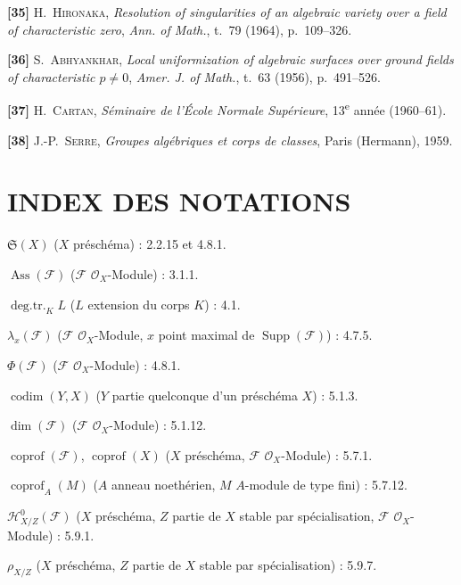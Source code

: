 \documentclass[10pt,oneside]{book}
\newcommand{\oldpage}[2][]{%
  \setcounter{footnote}{0}%
  \marginpar{\scriptsize\textbf{#1}~|~#2}\ignorespaces}
\begin{document}
\textbf{[35]} H.~\textsc{Hironaka}, \emph{Resolution of singularities of an
algebraic variety over a field of characteristic zero}, \emph{Ann. of Math.},
t.~79 (1964), p.~109--326.

\textbf{[36]} S.~\textsc{Abhyankhar}, \emph{Local uniformization of algebraic
surfaces over ground fields of characteristic $p\ne0$}, \emph{Amer. J. of
Math.}, t.~63 (1956), p.~491--526.

\textbf{[37]} H.~\textsc{Cartan}, \emph{Séminaire de l'École Normale
Supérieure}, 13\textsuperscript{e} année (1960--61).

\textbf{[38]} J.-P.~\textsc{Serre}, \emph{Groupes algébriques et corps de
classes}, Paris (Hermann), 1959.

\endgroup

\clearpage
\oldpage[IV-2]{225}
{}
\section*{INDEX DES NOTATIONS}

\begingroup
\small
\setlength{\parindent}{0pt}
\setlength{\parskip}{2pt}

$\mathfrak S(X)$ ($X$ préschéma) : 2.2.15 et 4.8.1.

$\operatorname{Ass}(\mathscr F)$ ($\mathscr F$ $\mathcal O_X$-Module) : 3.1.1.

$\operatorname{deg.tr.}_K L$ ($L$ extension du corps $K$) : 4.1.

$\lambda_x(\mathscr F)$ ($\mathscr F$ $\mathcal O_X$-Module, $x$ point maximal
de $\operatorname{Supp}(\mathscr F)$) : 4.7.5.

$\Phi(\mathscr F)$ ($\mathscr F$ $\mathcal O_X$-Module) : 4.8.1.

$\operatorname{codim}(Y,X)$ ($Y$ partie quelconque d'un préschéma $X$) : 5.1.3.

$\dim(\mathscr F)$ ($\mathscr F$ $\mathcal O_X$-Module) : 5.1.12.

$\operatorname{coprof}(\mathscr F)$, $\operatorname{coprof}(X)$ ($X$
préschéma, $\mathscr F$ $\mathcal O_X$-Module) : 5.7.1.

$\operatorname{coprof}_A(M)$ ($A$ anneau noethérien, $M$ $A$-module de type
fini) : 5.7.12.

$\mathcal H^0_{X/Z}(\mathscr F)$ ($X$ préschéma, $Z$ partie de $X$ stable par
spécialisation, $\mathscr F$ $\mathcal O_X$-Module) : 5.9.1.

$\rho_{X/Z}$ ($X$ préschéma, $Z$ partie de $X$ stable par
spécialisation) : 5.9.7.
\end{document}
